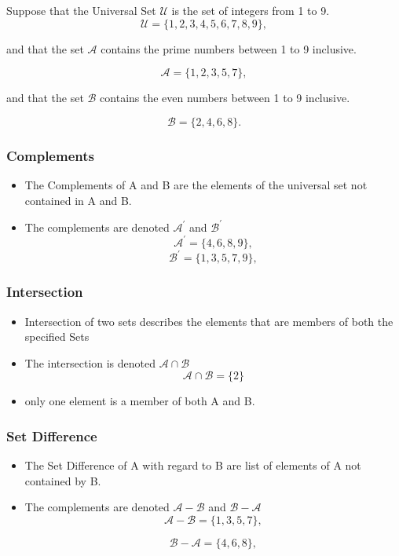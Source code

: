 \documentclass[]{report}
\begin{document}
Suppose that the Universal Set $\mathcal{U}$ is the set of integers from 1 to 9.
\[ \mathcal{U} = \{1,2,3,4,5,6,7,8,9\}, \]

and that the set $\mathcal{A}$ contains the prime numbers between 1 to 9 inclusive.

\[ \mathcal{A} = \{1,2,3,5,7\}, \]

and that the set $\mathcal{B}$ contains the even numbers between 1 to 9 inclusive.

\[ \mathcal{B} = \{2,4,6,8\}. \]

\subsubsection*{Complements}
\begin{itemize}

\item The Complements of A and B are the elements of the universal set not contained in A and B.

\item The complements are denoted $\mathcal{A}^{\prime}$ and $\mathcal{B}^{\prime}$
\[ \mathcal{A}^{\prime} = \{4,6,8,9\}, \]
\[ \mathcal{B}^{\prime} = \{1,3,5,7,9\}, \]

\end{itemize}



\subsubsection*{Intersection}
\begin{itemize}

\item Intersection of two sets describes the elements that are members of both the specified Sets

\item The intersection is denoted $\mathcal{A\cap B}$ 
\[ \mathcal{A\cap B} = \{2\}\]

\item only one element is a member of both A and B.
\end{itemize}

\subsubsection*{Set Difference}
\begin{itemize}

\item The Set Difference of A with regard to B are list of elements of A not contained by B.

\item The complements are denoted $\mathcal{A-B}$ and $\mathcal{B-A}$
\[ \mathcal{A-B} = \{1,3,5,7\}, \]

\[ \mathcal{B-A} = \{4,6,8\}, \]
\end{itemize}
\end{document}
